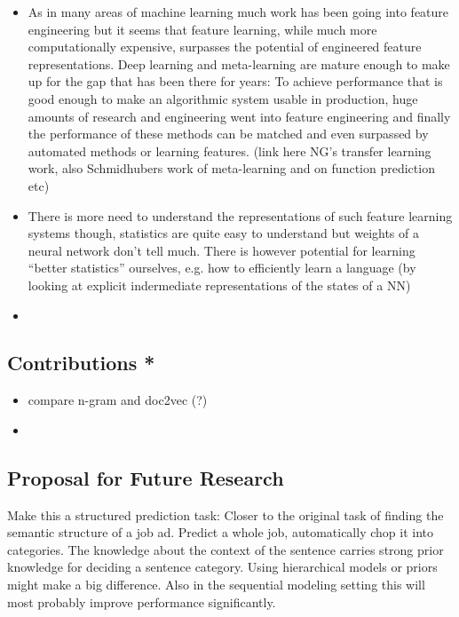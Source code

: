 \begin{itemize}
  \item As in many areas of machine learning much work has been going into feature engineering but it seems that feature learning, while much more computationally expensive, surpasses the potential of engineered feature representations. Deep learning and meta-learning are mature enough to make up for the gap that has been there for years: To achieve performance that is good enough to make an algorithmic system usable in production, huge amounts of research and engineering went into feature engineering and finally the performance of these methods can be matched and even surpassed by automated methods or learning features. (link here NG's transfer learning work, also Schmidhubers work of meta-learning and on function prediction etc)
  \item There is more need to understand the representations of such feature learning systems though, statistics are quite easy to understand but weights of a neural network don't tell much. There is however potential for learning ``better statistics'' ourselves, e.g. how to efficiently learn a language (by looking at explicit indermediate representations of the states of a NN)
  \item
\end{itemize}


\subsection{Contributions *}
\label{sub:contributions}

\begin{itemize}
  \item compare n-gram and doc2vec (?)
  \item
\end{itemize}

\subsection{Proposal for Future Research}
\label{sub:further-research}

Make this a structured prediction task: Closer to the original task of finding the semantic structure of a job ad. Predict a whole job, automatically chop it into categories. The knowledge about the context of the sentence carries strong prior knowledge for deciding a sentence category. Using hierarchical models or priors might make a big difference. Also in the sequential modeling setting this will most probably improve performance significantly.

